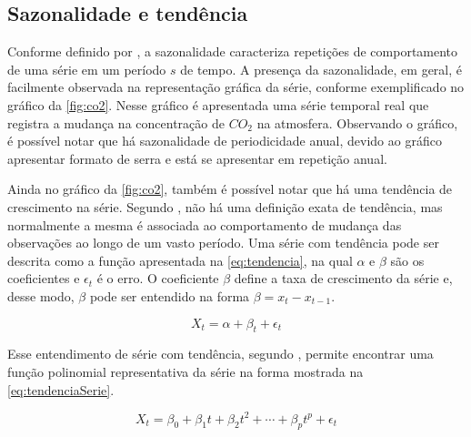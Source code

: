 \documentclass[
    12pt,
    oneside,
    a4paper,
    english,
    brazil
]{abntex2}
\begin{document}
\subsection{Sazonalidade e tendência}

Conforme   definido  por   ,   a  sazonalidade   caracteriza
repetições de comportamento de uma série em um período $s$ de tempo. A presença
da sazonalidade, em  geral, é facilmente observada na  representação gráfica da
série, conforme exemplificado no gráfico  da \autoref{fig:co2}. Nesse gráfico é
apresentada uma série  temporal real que registra a mudança  na concentração de
$CO_2$ na atmosfera. Observando o gráfico, é possível notar que há sazonalidade
de periodicidade anual, devido ao gráfico apresentar formato de serra e está se
apresentar em repetição anual.

Ainda  no  gráfico  da  \autoref{fig:co2},  também  é  possível  notar  que  há
uma  tendência de  crescimento na  série. Segundo  , não  há
uma  definição exata  de  tendência, mas  normalmente a  mesma  é associada  ao
comportamento  de  mudança  das  observações  ao longo  de  um  vasto  período.
Uma  série  com tendência  pode  ser  descrita  como  a função  apresentada  na
\autoref{eq:tendencia},  na  qual $\alpha$  e  $\beta$  são os  coeficientes  e
$\epsilon_t$ é  o erro. O coeficiente  $\beta$ define a taxa  de crescimento da
série  e, desse  modo, $\beta$  pode  ser entendido  na  forma $\beta  = x_t  -
x_{t-1}$.

\begin{equation}
    \label{eq:tendencia} X_t = \alpha + \beta_t + \epsilon_t
\end{equation}

Esse entendimento de série  com tendência, segundo , permite
encontrar uma  função polinomial representativa  da série na forma  mostrada na
\autoref{eq:tendenciaSerie}.

\begin{equation}
    \label{eq:tendenciaSerie}
    X_t = \beta_0 + \beta_1t + \beta_2t^2 + \cdots + \beta_{p}t^p + \epsilon_t
\end{equation}

\end{document}
